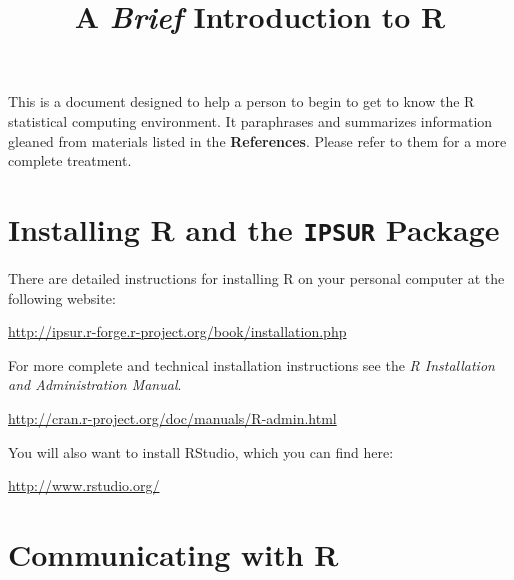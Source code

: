 \documentclass[english]{article}
\begin{document}
\title{A \emph{Brief} Introduction to \textsf{R}}

\maketitle
This is a document designed to help a person to begin to get to know
the \textsf{R} statistical computing environment. It paraphrases and
summarizes information gleaned from materials listed in the \textbf{References}.
Please refer to them for a more complete treatment.


\section{Installing \textsf{R} and the \texttt{IPSUR} Package}

There are detailed instructions for installing \textsf{R} on your
personal computer at the following website:

\begin{center}
\url{http://ipsur.r-forge.r-project.org/book/installation.php}
\par\end{center}

\noindent For more complete and technical installation instructions
see the \emph{R Installation and Administration Manual}.

\begin{center}
\url{http://cran.r-project.org/doc/manuals/R-admin.html}
\par\end{center}

\noindent You will also want to install RStudio, which you can find
here:

\begin{center}
\url{http://www.rstudio.org/}
\par\end{center}


\section{Communicating with \textsf{R}}
\end{document}
